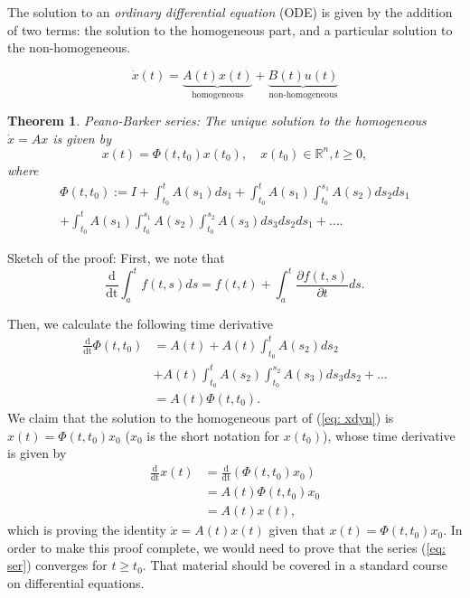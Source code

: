 \documentclass[11pt,a4paper,titlepage]{article}
\newtheorem{theorem}{Theorem}
\begin{document}
The solution to an \emph{ordinary differential equation} (ODE) is given by the addition of two terms: the solution to the homogeneous part, and a particular solution to the non-homogeneous.

\begin{equation}
	\dot x(t) = \underbrace{A(t)x(t)}_{\text{homogeneous}} + \underbrace{B(t)u(t)}_{\text{non-homogeneous}}
	\label{eq: xdyn}
\end{equation}

\begin{theorem}{Peano-Barker series:}
The unique solution to the homogeneous $\dot x = Ax$ is given by
	\begin{equation}
		x(t) = \Phi(t,t_0)x(t_0), \quad x(t_0)\in\mathbb{R}^n, t\geq 0,
	\end{equation}
where
	\begin{align}
		\Phi(t,t_0) := I + \int_{t_0}^t A(s_1)ds_1 + \int_{t_0}^t A(s_1) \int_{t_0}^{s_1} A(s_2)ds_2ds_1 \nonumber \\ + \int_{t_0}^t A(s_1) \int_{t_0}^{s_1} A(s_2)\int_{t_0}^{s_2} A(s_3) ds_3ds_2ds_1 + \dots . \label{eq: ser}
	\end{align}
\end{theorem}
Sketch of the proof:
First, we note that
\begin{equation}
	\frac{\mathrm{d}}{\mathrm{dt}} \int_a^t f(t,s)ds = f(t,t) + \int_a^t \frac{\partial f(t,s)}{\partial t}ds.
\end{equation}

Then, we calculate the following time derivative
	\begin{align}
		\frac{\mathrm{d}}{\mathrm{dt}}\Phi(t,t_0) &= A(t) + A(t)\int_{t_0}^{t}A(s_2)ds_2 \nonumber \\ &+ A(t)\int_{t_0}^t A(s_2) \int_{t_0}^{s_2} A(s_3)ds_3ds_2 + \dots \nonumber \\
		&= A(t) \Phi(t,t_0).
	\end{align}
We claim that the solution to the homogeneous part of (\ref{eq: xdyn}) is $x(t) = \Phi(t,t_0)x_0$ ($x_0$ is the short notation for $x(t_0)$), whose time derivative is given by
\begin{align}
	\frac{\mathrm{d}}{\mathrm{dt}} x(t) &= \frac{\mathrm{d}}{\mathrm{dt}}\left(\Phi(t,t_0)x_0\right) \nonumber \\
	&= A(t) \Phi(t,t_0) x_0 \nonumber \\
	&= A(t)x(t),
\end{align}
which is proving the identity $\dot x = A(t)x(t)$ given that $x(t) = \Phi(t,t_0)x_0$. In order to make this proof complete, we would need to prove that the series (\ref{eq: ser}) converges for $t\geq t_0$. That material should be covered in a standard course on differential equations.
\end{document}
